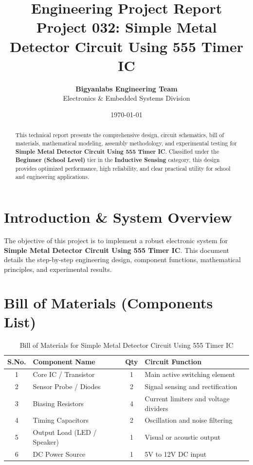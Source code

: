 \documentclass[11pt,a4paper]{article}
\title{\textbf{\Huge Engineering Project Report}\\[0.5em] \Large Project 032: Simple Metal Detector Circuit Using 555 Timer IC}
\author{\textbf{Bigyanlabs Engineering Team}\\ Electronics \& Embedded Systems Division}
\date{\today}
\begin{document}
\maketitle
\thispagestyle{empty}

\begin{abstract}
This technical report presents the comprehensive design, circuit schematics, bill of materials, mathematical modeling, assembly methodology, and experimental testing for \textbf{Simple Metal Detector Circuit Using 555 Timer IC}. Classified under the \textbf{Beginner (School Level)} tier in the \textbf{Inductive Sensing} category, this design provides optimized performance, high reliability, and clear practical utility for school and engineering applications.
\end{abstract}

\newpage
\tableofcontents
\newpage

\section{Introduction \& System Overview}
The objective of this project is to implement a robust electronic system for \textbf{Simple Metal Detector Circuit Using 555 Timer IC}. This document details the step-by-step engineering design, component functions, mathematical principles, and experimental results.

\section{Bill of Materials (Components List)}
\begin{table}[h!]
\centering
\caption{Bill of Materials for Simple Metal Detector Circuit Using 555 Timer IC}
\vspace{0.5em}
\begin{tabular}{clcp{7cm}}
\toprule
\textbf{S.No.} & \textbf{Component Name} & \textbf{Qty} & \textbf{Circuit Function} \\
\midrule
1 & Core IC / Transistor & 1 & Main active switching element \\
2 & Sensor Probe / Diodes & 2 & Signal sensing and rectification \\
3 & Biasing Resistors & 4 & Current limiters and voltage dividers \\
4 & Timing Capacitors & 2 & Oscillation and noise filtering \\
5 & Output Load (LED / Speaker) & 1 & Visual or acoustic output \\
6 & DC Power Source & 1 & 5V to 12V DC input \\
\bottomrule
\end{tabular}
\end{table}
\end{document}
